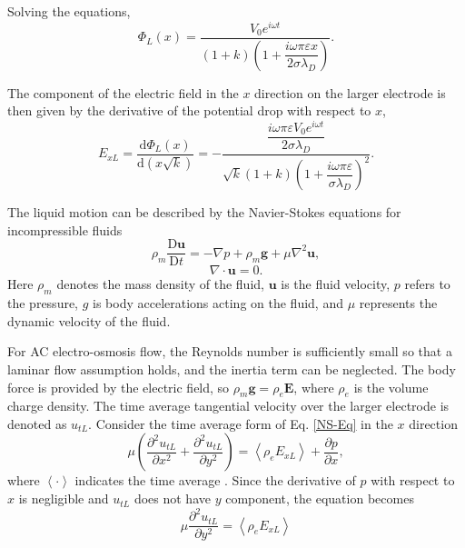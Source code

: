 \documentclass[journal,svgnames,twocolumn,x11names]{IEEEtran}
\begin{document}
Solving the equations,
\begin{equation}
    \Phi_L(x)=\frac{V_0e^{i\omega t}}{(1+k)\left(1+\dfrac{i\omega\pi\varepsilon x}{2\sigma\lambda_D}\right)}.
\end{equation}

The component of the electric field in the $x$ direction on the larger electrode is then given by the derivative of the potential drop with respect to $x$,
\begin{equation}
    E_{xL}=\frac{\mathrm{d}\Phi_L(x)}{\mathrm{d}\left(x\sqrt{k}\right)}=-\frac{\dfrac{i\omega\pi\varepsilon V_0e^{i\omega t}}{2\sigma\lambda_D}}{\sqrt{k}(1+k)\left(1+\dfrac{i\omega\pi\varepsilon}{\sigma\lambda_D}\right)^2}.
\end{equation}

The liquid motion can be described by the Navier-Stokes equations for incompressible fluids
\begin{equation}
    \rho_m\frac{\mathrm{D}\mathbf{u}}{\mathrm{D}t}=-\nabla p+\rho_m\mathbf{g}+\mu\nabla^2\mathbf{u},
    \label{NS-Eq}
\end{equation}
\begin{equation}
    \nabla\cdot\mathbf{u}=0.
\end{equation}
Here $\rho_m$ denotes the mass density of the fluid, $\mathbf{u}$ is the fluid velocity, $p$ refers to the pressure, $g$ is body accelerations acting on the fluid, and $\mu$ represents the dynamic velocity of the fluid.

For AC electro-osmosis flow, the Reynolds number is sufficiently small so that a laminar flow assumption holds, and the inertia term can be neglected. The body force is provided by the electric field, so $\rho_m\mathbf{g}=\rho_e\mathbf{E}$, where $\rho_e$ is the volume charge density. The time average tangential velocity over the larger electrode is denoted as $u_{tL}$. Consider the time average form of Eq. \ref{NS-Eq} in the $x$ direction
\begin{equation}
    \mu\left(\frac{\partial^2u_{tL}}{\partial x^2}+\frac{\partial^2u_{tL}}{\partial y^2}\right)=\left<\rho_eE_{xL}\right>+\frac{\partial p}{\partial x},
\end{equation}
where $\left<\cdot\right>$ indicates the time average \cite{physreveii}. Since the derivative of $p$ with respect to $x$ is negligible and $u_{tL}$ does not have $y$ component, the equation becomes
\begin{equation}
    \mu\frac{\partial^2u_{tL}}{\partial y^2}=\left<\rho_eE_{xL}\right>
\end{equation}
\end{document}
